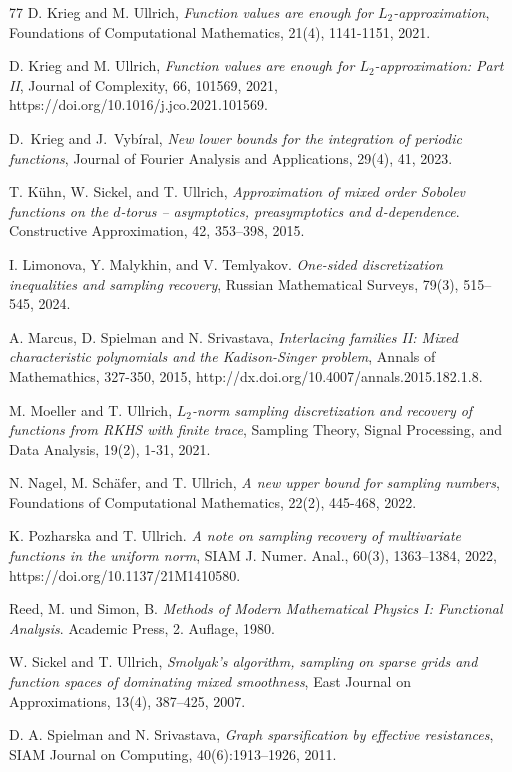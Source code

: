 \documentclass[a4paper,11pt]{article}
\renewcommand{\(}{\left (}
\renewcommand{\)}{\right )}
\newcommand{\<}{\langle}
\renewcommand{\>}{\rangle}
\theoremstyle{definition}
\begin{document}
\begin{thebibliography}{77}
 D. Krieg and M. Ullrich,
{\it Function values are enough for $L_2$-approximation}, 
Foundations of Computational Mathematics, 21(4), 1141-1151, 2021.

 D. Krieg and M. Ullrich,
{\it Function values are enough for $L_2$-approximation: Part II}, 
Journal of Complexity, 66, 101569, 2021, https://doi.org/10.1016/j.jco.2021.101569.

D.~Krieg and J.~Vybíral,
{\it New lower bounds for the integration of periodic functions},
Journal of Fourier Analysis and Applications, 29(4), 41, 2023.

 T. Kühn, W. Sickel, and T. Ullrich, {\it Approximation of mixed order Sobolev functions on the $d$-torus -- asymptotics, preasymptotics and $d$-dependence}.
Constructive Approximation, 42, 353--398, 2015.

 I. Limonova, Y. Malykhin, and V. Temlyakov. {\it One-sided discretization inequalities and sampling recovery}, Russian Mathematical Surveys, 79(3), 515--545, 2024.

 A. Marcus, D. Spielman and N. Srivastava, {\it Interlacing families II: Mixed characteristic polynomials and the Kadison-Singer problem}, Annals of Mathemathics, 327-350, 2015, http://dx.doi.org/10.4007/annals.2015.182.1.8.

 M. Moeller and T. Ullrich, {\it$ L_2 $-norm sampling discretization and recovery of functions from RKHS with finite trace}, Sampling Theory, Signal Processing, and Data Analysis, 19(2), 1-31, 2021.

 N. Nagel, M. Sch\"afer, and T. Ullrich,
{\it A new upper bound for sampling numbers}, Foundations of Computational Mathematics, 22(2), 445-468, 2022.

K. Pozharska and T. Ullrich.
{\it A note on sampling recovery of multivariate functions in the uniform norm}, 
SIAM J. Numer. Anal., 60(3),  1363--1384, 2022, https://doi.org/10.1137/21M1410580. 

Reed, M. und Simon, B.
\newblock \emph{Methods of Modern Mathematical Physics I: Functional Analysis}.
\newblock Academic Press, 2. Auflage, 1980.

W. Sickel and T. Ullrich,        
{\it Smolyak's algorithm, sampling on sparse grids and function spaces        
of dominating mixed smoothness},        
East Journal on Approximations, 13(4), 387--425, 2007.  

D. A. Spielman and N. Srivastava, {\it Graph sparsification by effective resistances},
SIAM Journal on Computing, 40(6):1913--1926, 2011.


\end{thebibliography}
\end{document}
